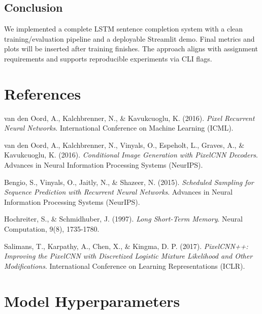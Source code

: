 \documentclass[12pt,a4paper]{article}
\begin{document}
\subsection{Conclusion}

We implemented a complete LSTM sentence completion system with a clean training/evaluation pipeline and a deployable Streamlit demo. Final metrics and plots will be inserted after training finishes. The approach aligns with assignment requirements and supports reproducible experiments via CLI flags.

\section{References}

\begin{thebibliography}{9}

van den Oord, A., Kalchbrenner, N., \& Kavukcuoglu, K. (2016). 
\textit{Pixel Recurrent Neural Networks}. 
International Conference on Machine Learning (ICML).

van den Oord, A., Kalchbrenner, N., Vinyals, O., Espeholt, L., Graves, A., \& Kavukcuoglu, K. (2016). 
\textit{Conditional Image Generation with PixelCNN Decoders}. 
Advances in Neural Information Processing Systems (NeurIPS).

Bengio, S., Vinyals, O., Jaitly, N., \& Shazeer, N. (2015). 
\textit{Scheduled Sampling for Sequence Prediction with Recurrent Neural Networks}. 
Advances in Neural Information Processing Systems (NeurIPS).

Hochreiter, S., \& Schmidhuber, J. (1997). 
\textit{Long Short-Term Memory}. 
Neural Computation, 9(8), 1735-1780.

Salimans, T., Karpathy, A., Chen, X., \& Kingma, D. P. (2017). 
\textit{PixelCNN++: Improving the PixelCNN with Discretized Logistic Mixture Likelihood and Other Modifications}. 
International Conference on Learning Representations (ICLR).

\end{thebibliography}

\newpage
\appendix

\section{Model Hyperparameters}
\end{document}
